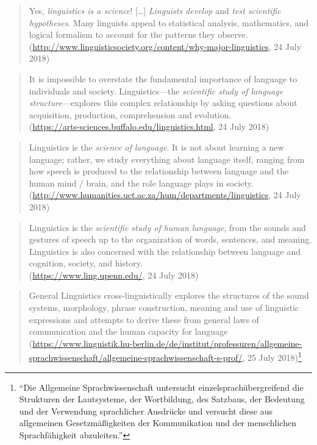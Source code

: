\documentclass[output=paper]{langscibook}
\begin{document}
\begin{quotation}
Yes, \emph{linguistics is a science}! […] \emph{Linguists develop} and \emph{test scientific hypotheses}. Many linguists appeal to statistical analysis, mathematics, and logical formalism to account for the patterns they observe.\\
(\url{http://www.linguisticsociety.org/content/why-major-linguistics}, 24 July 2018)
\end{quotation}

\begin{quotation}
It is impossible to overstate the fundamental importance of language to individuals and society. Linguistics—the \emph{scientific study of language structure}—explores this complex relationship by asking questions about acquisition, production, comprehension and evolution.\\
(\url{https://arts-sciences.buffalo.edu/linguistics.html}, 24 July 2018)
\end{quotation}

\begin{quotation}
Linguistics is the \emph{science of language}. It is not about learning a new language; rather, we study everything about language itself, ranging from how speech is produced to the relationship between language and the human mind / brain, and the role language plays in society.\\
(\url{http://www.humanities.uct.ac.za/hum/departments/linguistics}, 24 July 2018)
\end{quotation}

\begin{quotation}
Linguistics is the \emph{scientific study of human language}, from the sounds and gestures of speech up to the organization of words, sentences, and meaning. Linguistics is also concerned with the relationship between language and cognition, society, and history.\\
(\url{https://www.ling.upenn.edu/}, 24 July 2018)
\end{quotation}

\begin{quotation}
General Linguistics cross-linguistically explores the structures of the sound systems, morphology, phrase construction, meaning and use of linguistic expressions and attempts to derive these from general laws of communication and the human capacity for language
(\url{https://www.linguistik.hu-berlin.de/de/institut/professuren/allgemeine-sprachwissenschaft/allgemeine-sprachwissenschaft-s-prof/}, 25 July 2018)\footnote{``Die Allgemeine Sprachwissenschaft untersucht einzelsprachübergreifend die Strukturen der Lautsysteme, der Wortbildung, des Satzbaus, der Bedeutung und der Verwendung sprachlicher Ausdrücke und versucht diese aus allgemeinen Gesetzmäßigkeiten der Kommunikation und der menschlichen Sprachfähigkeit abzuleiten.''}
\end{quotation}
\end{document}
